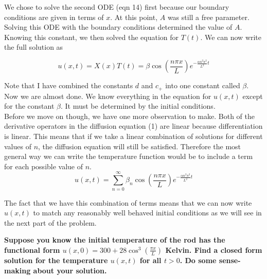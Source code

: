 \documentclass[a4paper, 11pt]{article}
\newenvironment{solution}{%
	\begin{list}{}{%
			\setlength{\topsep}{0pt}%
			\setlength{\leftmargin}{0.5cm}%
			\setlength{\rightmargin}{0.5cm}%
			\setlength{\listparindent}{\parindent}%
			\setlength{\itemindent}{\parindent}%
			\setlength{\parsep}{\parskip}%
		}%
		\item[]}{\end{list}}
\begin{document}
\begin{enumerate}[leftmargin=0em]
\begin{solution}
   We chose to solve the second ODE (eqn 14) first because our boundary conditions
   are given in terms of $x$. At this point, $A$ was still a free parameter.
   Solving this ODE with the boundary conditions determined the value of $A$. Knowing this
   constant, we then solved the equation for $T(t)$. We can now write the full
   solution as

   \begin{equation}
     u(x,t) = X(x)T(t) = \beta\cos\left(\frac{n\pi x}{L}\right)e^{-\frac{\alpha n^2\pi^2}{L^2}t}
   \end{equation}
   
   Note that I have combined the constants $d$ and $c_+$ into one constant
   called $\beta$. Now we are almost done. We know everything in the equation for
   $u(x,t)$ except for the constant $\beta$. It must be determined by the initial
   conditions. \\

   Before we move on though, we have one more observation to make. Both of the
   derivative operators in the diffusion equation (1) are linear because
   differentiation is linear. This means
   that if we take a linear combination of solutions for different values of $n$,
   the diffusion equation will still be satisfied. Therefore the most general
   way we can write the temperature function would be to include a term for each
   possible value of $n$.
   \begin{equation}
     u(x,t) = \sum\limits_{n=0}^{\infty} \beta_n\cos\left(\frac{n\pi x}{L}\right)e^{-\frac{\alpha n^2\pi^2}{L^2}t}
   \end{equation}

   The fact that we have this combination of terms means that we can now write
   $u(x,t)$ to match any reasonably well behaved initial conditions as we will
   see in the next part of the problem. 
    
    \end{solution}

    \item \textbf{Suppose you know the initial temperature of the rod has the
        functional form $u(x,0)=300+28\cos^3\left(\frac{\pi x}{L}\right)$
        Kelvin. Find a closed form solution for the temperature $u(x,t)$ for all
        $t>0$. Do some sense-making about your solution.}\\
      

\end{enumerate}
\end{document}
